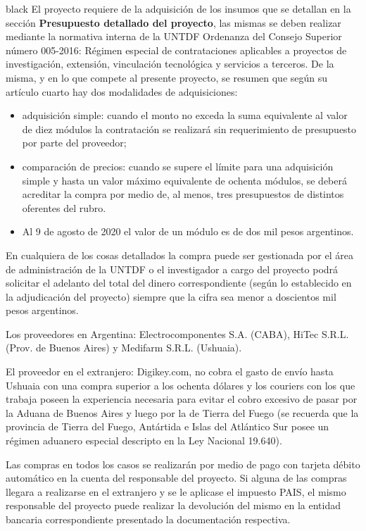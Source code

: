 \documentclass[11pt]{charter}
\begin{document}
\begin{consigna}{black}
El proyecto requiere de la adquisición de los insumos que se detallan en la sección \textbf{Presupuesto detallado del proyecto}, las mismas se deben realizar mediante la normativa interna de la UNTDF Ordenanza del Consejo Superior número 005-2016: Régimen especial de contrataciones aplicables a proyectos de investigación, extensión, vinculación tecnológica y servicios a terceros.
De la misma, y en lo que compete al presente proyecto, se resumen que según su artículo cuarto hay dos modalidades de adquisiciones:
	\begin{itemize}
	\item adquisición simple: cuando el monto no exceda la suma equivalente al valor de diez módulos la contratación se realizará sin requerimiento de presupuesto por parte del proveedor;
	\item comparación de precios: cuando se supere el límite para una adquisición simple y hasta un valor máximo equivalente de ochenta módulos, se deberá acreditar la compra por medio de, al menos, tres presupuestos de distintos oferentes del rubro.
	\item Al 9 de agosto de 2020 el valor de un módulo es de dos mil pesos argentinos.
	\end{itemize}
En cualquiera de los cosas detallados la compra puede ser gestionada por el área de administración de la UNTDF o el investigador a cargo del proyecto podrá solicitar el adelanto del total del dinero correspondiente (según lo establecido en la adjudicación del proyecto) siempre que la cifra sea menor a doscientos mil pesos argentinos.

Los proveedores en Argentina: Electrocomponentes S.A. (CABA), HiTec S.R.L. (Prov. de Buenos Aires) y Medifarm S.R.L. (Ushuaia).

El proveedor en el extranjero: Digikey.com, no cobra el gasto de envío hasta Ushuaia con una compra superior a los ochenta dólares y los couriers con los que trabaja poseen la experiencia necesaria para evitar el cobro excesivo de pasar por la Aduana de Buenos Aires y luego por la de Tierra del Fuego (se recuerda que la provincia de Tierra del Fuego, Antártida e Islas del Atlántico Sur posee un régimen aduanero especial descripto en la Ley Nacional 19.640).

Las compras en todos los casos se realizarán por medio de pago con tarjeta débito automático en la cuenta del responsable del proyecto. Si alguna de las compras llegara a realizarse en el extranjero y se le aplicase el impuesto PAIS, el mismo responsable del proyecto puede realizar la devolución del mismo en la entidad bancaria correspondiente presentado la documentación respectiva.
\end{consigna}
\end{document}
